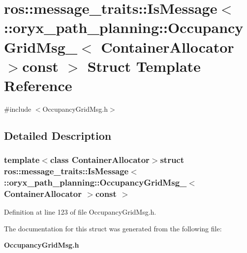 \section{ros\-:\-:message\-\_\-traits\-:\-:\-Is\-Message$<$ \-:\-:oryx\-\_\-path\-\_\-planning\-:\-:\-Occupancy\-Grid\-Msg\-\_\-$<$ \-Container\-Allocator $>$const $>$ \-Struct \-Template \-Reference}
\label{structros_1_1message__traits_1_1IsMessage_3_01_1_1oryx__path__planning_1_1OccupancyGridMsg___3_066b071b372c64b6f41543f75cce14c40}


{\ttfamily \#include $<$\-Occupancy\-Grid\-Msg.\-h$>$}



\subsection{\-Detailed \-Description}
\subsubsection*{template$<$class Container\-Allocator$>$struct ros\-::message\-\_\-traits\-::\-Is\-Message$<$ \-::oryx\-\_\-path\-\_\-planning\-::\-Occupancy\-Grid\-Msg\-\_\-$<$ Container\-Allocator $>$const  $>$}



\-Definition at line 123 of file \-Occupancy\-Grid\-Msg.\-h.



\-The documentation for this struct was generated from the following file\-:\begin{DoxyCompactItemize}
\item 
{\bf \-Occupancy\-Grid\-Msg.\-h}\end{DoxyCompactItemize}

